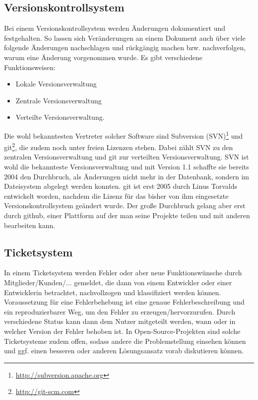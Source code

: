 \subsection{Versionskontrollsystem}
Bei einem Versionskontrollsystem werden Änderungen dokumentiert und
festgehalten. So lassen sich Veränderungen an einem Dokument auch
über viele folgende Änderungen nachschlagen und rückgängig machen bzw.
nachverfolgen, warum eine Änderung vorgenommen wurde.
Es gibt verschiedene Funktionsweisen:
\begin{itemize}
  \item Lokale Versionsverwaltung
  \item Zentrale Versionsverwaltung 
  \item Verteilte Versionsverwaltung. 
\end{itemize}
Die wohl bekanntesten Vertreter solcher Software sind Subversion (SVN)\footnote{\url{http://subversion.apache.org}} und git\footnote{\url{http://git-scm.com}}, die
zudem noch unter freien Lizenzen stehen.
Dabei zählt SVN zu den zentralen Versionsverwaltung und git zur 
verteilten Versionsverwaltung.
SVN ist wohl die bekannteste Versionsverwaltung und mit Version 1.1 schaffte
sie bereits 2004 den Durchbruch, als Änderungen nicht mehr in der Datenbank, 
sondern im Dateisystem abgelegt werden konnten.
git ist erst 2005 durch Linus Torvalds entwickelt worden, nachdem die
Lizenz für das bisher von ihm eingesetzte Versionskontrollsystem geändert 
wurde. Der große Durchbruch gelang aber erst durch github, einer Plattform
auf der man seine Projekte teilen und mit anderen bearbeiten kann.

\subsection{Ticketsystem}
In einem Ticketsystem werden Fehler oder aber neue Funktionswünsche 
durch Mitglieder/Kunden/... gemeldet, die dann von einem Entwickler 
oder einer Entwicklerin betrachtet, nachvollzogen und klassifiziert
werden können. 
Voraussetzung für eine Fehlerbehebung ist eine genaue Fehlerbeschreibung 
und ein reproduzierbarer Weg, um den Fehler zu erzeugen/hervorzurufen.
Durch verschiedene Status kann dann dem Nutzer mitgeteilt werden, wann 
oder in welcher Version der Fehler behoben ist.
In Open-Source-Projekten sind solche Ticketsysteme zudem offen, sodass 
andere die Problemstellung einsehen können und ggf. einen besseren
oder anderen Lösungsansatz vorab diskutieren können.

\newpage
